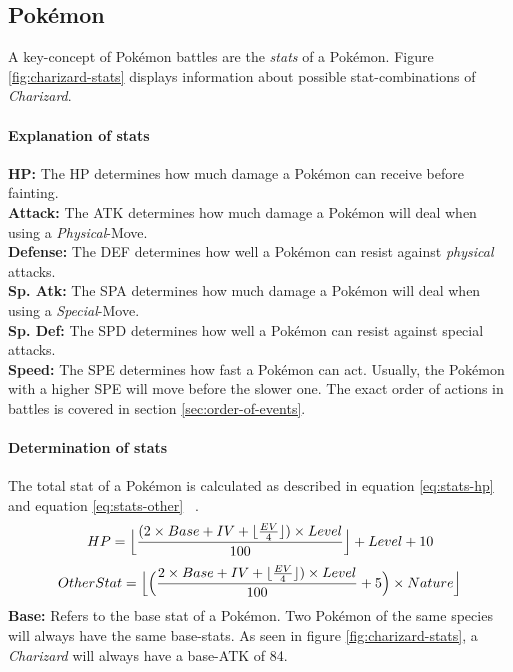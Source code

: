 \subsection{Pokémon}
\label{sec:pokemon}
A key-concept of Pokémon battles are the \textit{stats} of a Pokémon. 
Figure \ref{fig:charizard-stats} displays information about possible stat-combinations of 
\textit{Charizard}. 
\paragraph{Explanation of stats}
\textbf{HP:} The \ac{HP} determines how much damage a Pokémon can receive before fainting. \\
\textbf{Attack:} The \ac{ATK} determines how much damage a Pokémon will deal when using 
a \textit{Physical}-Move. \\
\textbf{Defense:} The \ac{DEF} determines how well a Pokémon can resist against \textit{physical} attacks. \\
\textbf{Sp. Atk:} The \ac{SPA} determines how much damage a Pokémon will deal when using
a \textit{Special}-Move. \\
\textbf{Sp. Def:} The \ac{SPD} determines how well a Pokémon can resist against special attacks. \\
\textbf{Speed:} The \ac{SPE} determines how fast a Pokémon can act. Usually, the Pokémon with a higher
\ac{SPE} will move before the slower one. The exact order of actions in battles is covered in section
\ref{sec:order-of-events}.

\paragraph{Determination of stats}
\label{sec:stat-calculation}
The total stat of a Pokémon is calculated as described in equation \ref{eq:stats-hp} and equation 
\ref{eq:stats-other} ~\autocite{Bulbapedia:Stat}.
\begin{equation}
	\label{eq:stats-hp}
	HP = \Bigl\lfloor \frac{(2 \times Base + IV + \lfloor \frac{EV}{4} \rfloor) \times Level}{100}\Bigr\rfloor
	+ Level + 10 \\
\end{equation}
\begin{equation}
	\label{eq:stats-other}
	OtherStat = \Bigl\lfloor \Big( \frac{2 \times Base + IV + \lfloor \frac{EV}{4} \rfloor) \times Level}
	{100} + 5\Big) \times Nature \Bigr\rfloor
\end{equation}
\textbf{Base:} Refers to the base stat of a Pokémon. Two Pokémon of the same species will always have the 
same base-stats. As seen in figure \ref{fig:charizard-stats}, a \textit{Charizard} will always have a
base-\ac{ATK} of 84.

